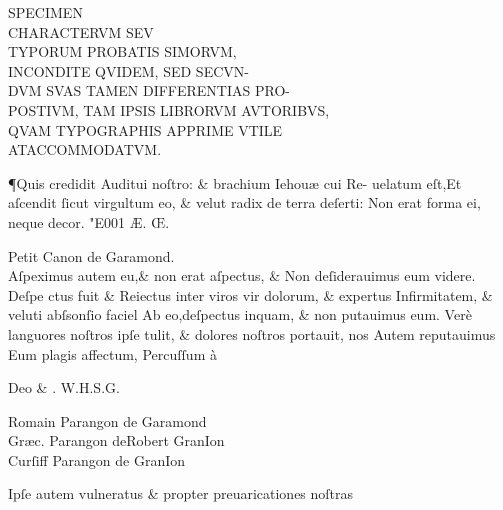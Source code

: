 \documentclass{article}
\newcommand{\threecolumntypefacenames}[3]{\begin{multicols}{3}
		\tiny
		\hfill \qquad \qquad \qquad \qquad #1\hspace*{\fill}\\
		\columnbreak
		\hfill #2\hspace*{\fill}\\
		\columnbreak
		\hfill #3\qquad \qquad \qquad \qquad \hspace*{\fill}
\end{multicols}}
\begin{document}
\centering
{{
		\fontsize{19}{16}\selectfont  SPECIMEN \\
		\fontsize{41}{33}\selectfont CHARACTERVM SEV \\
		\fontsize{23}{25}\selectfont TYPORUM PROBATIS SIMORVM\kern-3pt, \\
		\fontsize{19}{17}\selectfont INCONDITE QVIDEM, SED SECVN\kern-3pt-\\
		\fontsize{14}{16}\selectfont DVM SVAS TAMEN DIFFERENTIAS PRO\kern-2pt- \\
		\fontsize{9.5}{11.5}\selectfont POSTIVM, TAM IPSIS LIBRORVM AVTORIBVS\kern-2pt,\\
		\fontsize{7}{9}\selectfont QVAM TYPOGRAPHIS APPRIME VTILE\\
		\fontsize{5}{4}\selectfont AT\quad ACCOMMODATVM.\\}

\justifying
\huge
\noindent \P \quad \enspace Quis credidit Auditui noſtro: \& brachium Iehou\ae{} cui Re-\linebreak
uelatum eſt,Et aſcendit ſicut virgultum  eo, \& velut\linebreak
radix de terra deſerti: Non erat forma ei, neque decor. \char"E001{} \AE{}. \OE .\linebreak

\vspace{-0.7\baselineskip}
\small
\centering
Petit Canon de Garamond.\\
\vspace{-0.5\baselineskip}
\Large
\justifying
Aſpeximus autem eu,\& non erat aſpectus, \& Non deſiderauimus eum videre. Deſpe \linebreak
ctus fuit \& Reiectus inter viros vir dolorum, \& expertus Infirmitatem, \& veluti abſsonſio \linebreak
faciel Ab eo,deſpectus inquam, \& non putauimus eum. Ver\`e languores noſtros ipſe tulit, \linebreak
\& dolores noſtros portauit, nos Autem reputauimus Eum plagis affectum, Percuſſum \`a\linebreak

\centering
\vspace{-1\baselineskip}
Deo \& . \quad W.\quad H.\quad S.\quad G.\\
\vspace{-\baselineskip}
\threecolumntypefacenames{Romain Parangon de Garamond}{Gr\ae{}c. Parangon deRobert GranIon\quad \quad \quad \quad \quad \quad \quad \quad }{Curſiff Parangon de GranIon}
\vspace*{-\baselineskip}
\scriptsize
\begin{multicols}{2}
	\justifying
	\normalsize
	\justifying
	{Ipſe autem vulneratus \& propter preuaricationes noſtras\linebreak}


\end{multicols}}
\end{document}
